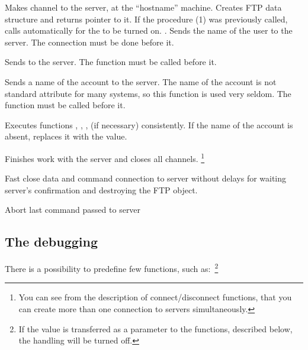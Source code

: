 {
  Makes channel to the server, at the ``hostname'' machine.
  Creates FTP data structure and returns pointer to it. If the procedure (1)
was previously called,  calls automatically  for the  to be turned on. 
  .
}
{
 Sends the name of the user to the server. The connection must be done before it.
}

{
 Sends  to the server. The function  must be called before it.
}

{
 Sends a name of the account to the server. The name of the account is not standard
 attribute for many systems, so this function is used very seldom.
 The function  must be called before it.
}

{
  Executes functions , , ,
   (if necessary)  consistently. If the name of the account is absent, 
  replaces it with the  value.
}

{ Finishes work with the server and closes all channels. 
\footnote{You can see from the description of connect/disconnect functions, that you can create 
more than one connection to servers simultaneously.}
}

{ Fast close data and command connection to server without delays for waiting
server's confirmation and destroying the FTP object.
}

{ Abort last command passed to server}


\subsection{The debugging} \label{debug} 

There is a possibility to predefine few functions, 
such as:~\footnote{If the  value is transferred as a parameter  to the functions, described below,
the handling will be turned off.}

